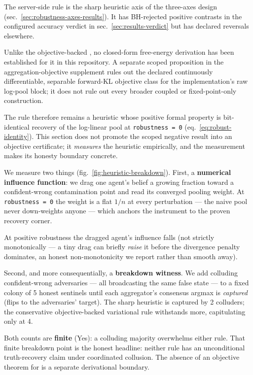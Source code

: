 \documentclass[
  english,
]{article}
\theoremstyle{plain}
\theoremstyle{definition}
\theoremstyle{remark}
\theoremstyle{definition}
\begin{document}
The server-side  rule is the sharp heuristic
axis of the three-axes design (sec.~\ref{sec:robustness-axes-results}).
It has BH-rejected positive contrasts in the configured accuracy verdict
in sec.~\ref{sec:results-verdict} but has declared reversals elsewhere.

Unlike the objective-backed , no
closed-form free-energy derivation has been established for it in this
repository. A separate scoped proposition in the aggregation-objective
supplement rules out the declared continuously differentiable, separable
forward-KL objective class for the implementation's raw log-pool block;
it does not rule out every broader coupled or fixed-point-only
construction.

The rule therefore remains a heuristic whose positive formal property is
bit-identical recovery of the log-linear pool at
\texttt{robustness\ =\ 0} (eq.~\ref{eq:robust-identity}). This section
does not promote the scoped negative result into an objective
certificate; it \emph{measures} the heuristic empirically, and the
measurement makes its honesty boundary concrete.

We measure two things (fig.~\ref{fig:heuristic-breakdown}). First, a
\textbf{numerical influence function}: we drag one agent's belief a
growing fraction toward a confident-wrong contamination point and read
its converged pooling weight. At \texttt{robustness\ =\ 0} the weight is
a flat \(1/n\) at every perturbation --- the naive pool never
down-weights anyone --- which anchors the instrument to the proven
recovery corner.

At positive robustness the dragged agent's influence falls (not strictly
monotonically --- a tiny drag can briefly \emph{raise} it before the
divergence penalty dominates, an honest non-monotonicity we report
rather than smooth away).

Second, and more consequentially, a \textbf{breakdown witness}. We add
colluding confident-wrong adversaries --- all broadcasting the same
false state --- to a fixed colony of 5 honest sentinels until each
aggregator's consensus argmax is \emph{captured} (flips to the
adversaries' target). The sharp heuristic is captured by 2 colluders;
the conservative objective-backed variational rule withstands more,
capitulating only at 4.

Both counts are \textbf{finite} (Yes): a colluding majority overwhelms
either rule. That finite breakdown point is the honest headline: neither
rule has an unconditional truth-recovery claim under coordinated
collusion. The absence of an objective theorem for
 is a separate derivational boundary.
\end{document}
